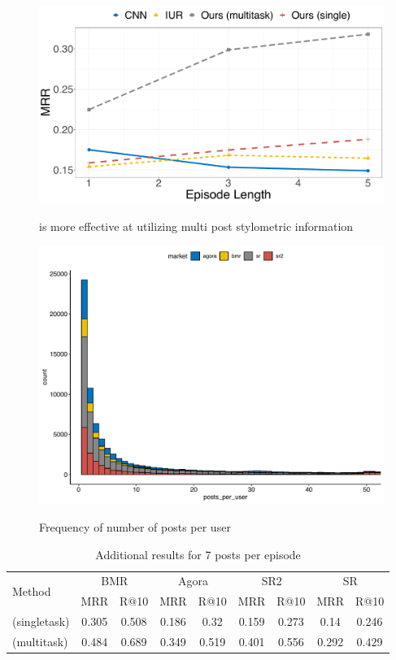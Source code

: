 \begin{figure}[!htbp]
    \centering
    \includegraphics[width=0.8\linewidth,alt={Line chart showing the improvements from \SYSMLmethodname{} across different episode lengths.}]{sysml/plots/length_comparison.png}
    \caption{\SYSMLmethodname{} is more effective at utilizing multi post stylometric information}
    \label{fig:len_comparison}
\end{figure}


\begin{figure}
    \centering
    \includegraphics[width=\linewidth,alt={Histogram of posts per user.}]{sysml/plots/posts_histogram.png}
    \caption{Frequency of number of posts per user}
    \label{fig:posts_freq}
\end{figure}

\begin{table}[!htbp]
    \small
    \centering
		\begin{tabular}{lcccccccc}
 		\toprule
			\multirow{2}{*}{Method}	&\multicolumn{2}{c}{BMR}	&	\multicolumn{2}{c}{Agora}	&	\multicolumn{2}{c}{SR2}	&	\multicolumn{2}{c}{SR}\\
					&MRR&	R@10&	MRR&	R@10&	MRR&	R@10&	MRR&	R@10\\
		\midrule
			\SYSMLmethodname{}  (singletask) &	0.305	&	0.508	&	0.186	&	0.32	&	0.159	&	0.273	&	0.14	&	0.246	\\
				\hline
			\SYSMLmethodname{}  (multitask) &	0.484	& 0.689	&	0.349	&	0.519	&	0.401	&	0.556	&	0.292	&	0.429	\\
					\bottomrule
    	\end{tabular}
    	\caption{Additional results for 7 posts per episode}
      \label{tab:additional_res_7}
\end{table}

